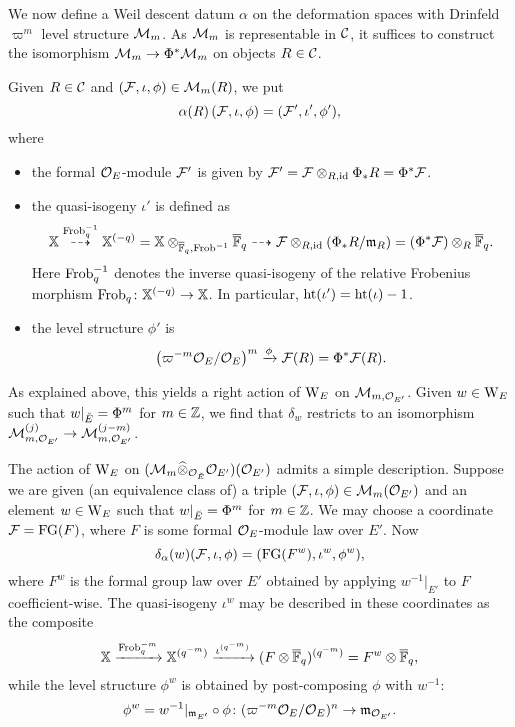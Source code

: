 \documentclass[../main.tex]{subfiles}
\begin{document}
We now define a Weil descent datum $\alpha$ on the deformation spaces with 
Drinfeld $\varpi^m$ level structure $\mathcal{M}_m$. As $\mathcal{M}_m$ is representable
in $\mathcal{C}$, it suffices to construct the isomorphism
$\mathcal{M}_m \to \Phi^* \mathcal{M}_m$ on objects $R \in \mathcal{C}$. 

Given $R\in \mathcal{C}$ and $(\mathcal{F}, \iota, \phi) \in \mathcal{M}_m(R)$, we put
\begin{equation*}
  \alpha(R) \left( \mathcal{F}, \iota, \phi \right) = (\mathcal{F}', \iota',\phi'),
\end{equation*}
where
\begin{itemize}
  \item the formal $\mathcal{O}_E$-module $\mathcal{F}'$ is given by $\mathcal{F}' = \mathcal{F} \otimes_{R,
    \operatorname{id}}
    \Phi_* R = \Phi^* \mathcal{F}$.
  \item the quasi-isogeny $\iota'$ is defined as
    \begin{equation*}
      \mathbb{X} \overset{\mathrm{Frob}_q^{-1}}{\dashrightarrow} \mathbb{X}^{(-q)} = \mathbb{X}
      \otimes_{\overline {\mathbb{F}}_q, \mathrm{Frob}^{-1}}
      {\overline {\mathbb{F}}_q} \dashrightarrow \mathcal{F} \otimes_{R, \operatorname{id}} (\Phi_* R/\mathfrak{m}_R) = (\Phi^*
      \mathcal{F}) \otimes_R {\overline {\mathbb{F}}_q}.
    \end{equation*}
    Here $\mathrm{Frob}_q^{-1}$ denotes the inverse quasi-isogeny of the relative
    Frobenius morphism $\mathrm{Frob}_q\colon \mathbb{X}^{(-q)} \to \mathbb{X}$. In particular, 
    $\textnormal{ht}(\iota') = \textnormal{ht}(\iota)-1$.
  \item the level structure $\phi'$ is
    \begin{equation*}
      \left({\varpi^{-m}\mathcal{O}_E}/{\mathcal{O}_E} \right)^m      
       \xrightarrow{\phi} \mathcal{F}(R) = \Phi^* \mathcal{F}(R).
    \end{equation*}
\end{itemize}

As explained above, this yields a right action of $\mathrm W_E$ on $\mathcal{M}_{m, \mathcal{O}_{{E'}}}$.
Given $w \in \mathrm W_E$ such that $w|_{\breve {E}} = \Phi^m$ for $m \in \mathbb{Z}$, we find
that $\delta_w$ restricts to an isomorphism $\mathcal{M}_{m, \mathcal{O}_{{E'}}}^{(j)} \to \mathcal{M}_{m,
\mathcal{O}_{{E'}}}^{(j-m)}$. 

\begin{xpl}
  The action of $\mathrm W_E$ on $(\mathcal{M}_{m}\widehat \otimes_{\mathcal{O}_{\breve {E}}}
  \mathcal{O}_{E'})({\mathcal{O}_{E'}})$ admits a simple description. Suppose we are given (an
  equivalence class of) a triple $(\mathcal{F}, \iota, \phi) \in \mathcal{M}_m({\mathcal{O}_{E'}})$ and
  an element $w \in \mathrm W_E$ such that $w|_{{\breve {E}}} = \Phi^m$ for $m \in \mathbb{Z}$. We
  may choose a coordinate $\mathcal{F} = \textnormal{FG}(F)$, where $F$ is some formal
  $\mathcal{O}_E$-module law over $E'$. 
  Now $$\delta_\alpha(w)(\mathcal{F}, \iota, \phi) = (\textnormal{FG}(F^w), \iota^w, \phi^w),$$
  where $F^w$ is the formal group law over $E'$ obtained by
  applying $w^{-1}|_{E'}$ to $F$ coefficient-wise. The quasi-isogeny $\iota^w$ may
  be described in these coordinates as the composite $$ \mathbb{X} \xrightarrow{\mathrm{Frob}_q^{-m}}
  \mathbb{X}^{(q^{-m})} \xrightarrow{\iota^{(q^{-m})}} (F \otimes {\overline{\mathbb{F}}_q})^{(q^{-m})} = F^w \otimes
  {\overline{\mathbb{F}}_q},$$ while the level structure $\phi^w$ is obtained by post-composing
  $\phi$ with $w^{-1}$: $$\phi^w = w^{-1}|_{\mathfrak{m}_{E'}} \circ \phi \colon
  (\varpi^{-m}\mathcal{O}_E/\mathcal{O}_E)^n \to \mathfrak{m}_{\mathcal{O}_{E'}}.$$
\end{xpl}
\end{document}
